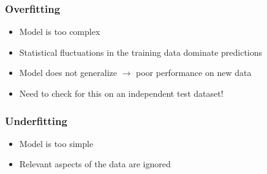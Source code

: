 \begin{frame}
    \frametitle{Overfitting}
    \begin{center}

      \begin{itemize}
        \item Model is too complex
        \item Statistical fluctuations in the training data dominate predictions
        \item Model does not generalize $\rightarrow$ poor performance on new data
        \item Need to check for this on an independent test dataset!
      \end{itemize}


    \end{center}
\end{frame}

\begin{frame}
    \frametitle{Underfitting}
    \begin{center}

      \begin{itemize}
        \item Model is too simple
        \item Relevant aspects of the data are ignored
      \end{itemize}


    \end{center}
\end{frame}

